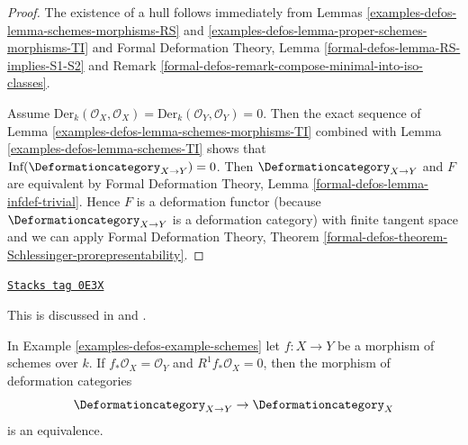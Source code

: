 \begin{proof}
The existence of a hull follows immediately from
Lemmas \ref{examples-defos-lemma-schemes-morphisms-RS} and
\ref{examples-defos-lemma-proper-schemes-morphisms-TI} and
Formal Deformation Theory, Lemma \ref{formal-defos-lemma-RS-implies-S1-S2}
and Remark \ref{formal-defos-remark-compose-minimal-into-iso-classes}.

\medskip\noindent
Assume $\text{Der}_k(\mathcal{O}_X, \mathcal{O}_X) =
\text{Der}_k(\mathcal{O}_Y, \mathcal{O}_Y) = 0$. Then
the exact sequence of Lemma \ref{examples-defos-lemma-schemes-morphisms-TI}
combined with Lemma \ref{examples-defos-lemma-schemes-TI}
shows that $\text{Inf}(\Deformationcategory_{X \to Y}) = 0$.
Then $\Deformationcategory_{X \to Y}$ and $F$ are equivalent by
Formal Deformation Theory, Lemma \ref{formal-defos-lemma-infdef-trivial}.
Hence $F$ is a deformation functor (because
$\Deformationcategory_{X \to Y}$ is a
deformation category) with finite tangent space and we can apply
Formal Deformation Theory, Theorem
\ref{formal-defos-theorem-Schlessinger-prorepresentability}.
\end{proof}

\begin{lemma}
\label{examples-defos-lemma-schemes-morphisms-smooth-to-base}
\href{https://stacks.math.columbia.edu/tag/0E3X}{\texttt{Stacks tag 0E3X}}

\begin{reference}
This is discussed in \cite[Section 5.3]{Ravi-Murphys-Law} and
\cite[Theorem 3.3]{Ran-deformations}.
\end{reference}
In Example \ref{examples-defos-example-schemes} let $f : X \to Y$ be a morphism of schemes
over $k$. If $f_*\mathcal{O}_X = \mathcal{O}_Y$ and $R^1f_*\mathcal{O}_X = 0$,
then the morphism of deformation categories
$$
\Deformationcategory_{X \to Y} \to \Deformationcategory_X
$$
is an equivalence.
\end{lemma}

